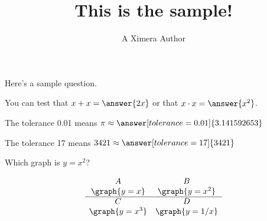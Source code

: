 \documentclass{ximera}
\title{This is the sample!}
\author{A Ximera Author}
\begin{document}
\maketitle

Here's a sample question.

\begin{problem}
\begin{multipleChoice}
\end{multipleChoice}
\end{problem}

\begin{problem}
   You can test that $x + x = \answer{2x}$ or that $x \cdot x = \answer{x^2}$.
\end{problem}

\begin{problem}
   The tolerance 0.01 means $\pi \approx \answer[tolerance=0.01]{3.141592653}$
\end{problem}

\begin{problem}
   The tolerance 17 means $3421 \approx \answer[tolerance=17]{3421}$
\end{problem}

\begin{problem}
    Which graph is $y=x^2$?

\[
\begin{array}{cc}
A & B \\
\graph{y=x} & \graph{y=x^2} \\ \hline
C & D \\
\graph{y=x^3} &\graph{y=1/x} \\
\end{array}
\]

\begin{multipleChoice}
\end{multipleChoice}
\end{problem}
\end{document}
